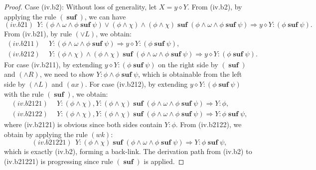 \documentclass[manuscript,screen]{acmart}
\newcommand{\cat}[0]{\diamond}
\DeclareMathOperator{\osuf}{\mathbf{suf}}
\begin{document}
\begin{proof}
\ifx
Case (iv.b2): Without loss of generality, let $X = y\cat Y$.
From (iv.b2), by applying the rule $(\osuf)$, we can have
$$
(iv.b21)\ \  Y : (\phi\wedge \omega\wedge \phi\osuf \psi) \vee (\phi\wedge\chi)\wedge (\phi\wedge\chi)\osuf (\phi\wedge \omega\wedge \phi\osuf \psi)\Rightarrow y\cat Y : (\phi\osuf \psi). 
$$
From (iv.b21), by rule $(\vee L)$, we obtain:
$$
\begin{aligned}
(iv.b211)\ \ & Y : (\phi\wedge \omega\wedge \phi\osuf \psi) \Rightarrow y\cat Y : (\phi\osuf \psi), \\
(iv.b212)\ \ & Y : (\phi\wedge\chi)\wedge (\phi\wedge\chi)\osuf (\phi\wedge \omega\wedge \phi\osuf \psi) \Rightarrow y\cat Y : (\phi\osuf \psi). 
\end{aligned}
$$
For case (iv.b211), by extending $y\cat Y : (\phi\osuf\psi)$ on the right side by $(\osuf)$ and $(\wedge R)$, we need to show $Y : \phi\wedge \phi\osuf\psi$, which is obtainable from the left side by $(\wedge L)$ and $(\textit{ax})$. 
For case (iv.b212), by extending $y\cat Y : (\phi\osuf\psi)$ with the rule $(\osuf)$, we obtain:
$$
\begin{aligned}
(iv.b2121)\ \ & Y : (\phi\wedge\chi), Y : (\phi\wedge\chi)\osuf (\phi\wedge \omega\wedge \phi\osuf \psi) \Rightarrow Y : \phi,\\
(iv.b2122)\ \ & Y : (\phi\wedge\chi), Y : (\phi\wedge\chi)\osuf (\phi\wedge \omega\wedge \phi\osuf \psi) \Rightarrow Y : \phi\osuf \psi, 
\end{aligned}
$$
where (iv.b2121) is obvious since both sides contain $Y:\phi$.
From (iv.b2122), we obtain by applying the rule $(wk)$:
$$
(iv.b21221)\ \ Y : (\phi\wedge\chi)\osuf (\phi\wedge \omega\wedge \phi\osuf \psi) \Rightarrow Y : \phi\osuf \psi, 
$$
which is exactly (iv.b2), forming a back-link.
The derivation path from (iv.b2) to (iv.b21221) is progressing since rule $(\osuf)$ is applied.
\fi


\end{proof}
\end{document}
